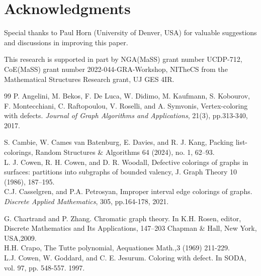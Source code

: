 \documentclass[12pt]{amsart}
\theoremstyle{definition}
\theoremstyle{remark}
\numberwithin{equation}{section}
\begin{document}
\section*{Acknowledgments}
Special thanks to  Paul Horn (University of Denver, USA)  for valuable suggestions and discussions in improving this paper.

This research is supported in part by NGA(MaSS) grant number UCDP-712,
CoE(MaSS) grant number 2022-044-GRA-Workshop,
NITheCS from the Mathematical Structures Research grant,
UJ GES 4IR.


\begin{thebibliography}{99}
 P. Angelini, M. Bekos, F. De Luca, W. Didimo, M. Kaufmann, S. Kobourov, F. Montecchiani, C. Raftopoulou, V. Roselli, and A. Symvonis, Vertex-coloring with defects. \textit{Journal of Graph Algorithms and Applications}, 21(3), pp.313-340, 2017.

 S. Cambie, W. Cames van Batenburg, E. Davies, and R. J. Kang, Packing list-colorings, Random Structures \& Algorithms 64 (2024), no. 1, 62–93. \\ %

 L. J. Cowen, R. H. Cowen, and D. R. Woodall,
Defective colorings of graphs in surfaces: partitions into subgraphs of bounded valency, J. Graph Theory 10 (1986), 187–195. \\ %

 C.J. Casselgren, and P.A. Petrosyan, Improper interval edge colorings of graphs. \textit{Discrete Applied Mathematics}, 305, pp.164-178, 2021.

 G. Chartrand and P. Zhang. Chromatic graph theory. In K.H. Rosen, editor, Discrete Mathematics and Its Applications,  147--203 Chapman \& Hall, New York, USA,2009. \\

H.H. Crapo, The  Tutte polynomial, Aequationes Math.,3 (1969) 211-229.\\

 L.J. Cowen, W. Goddard, and C. E. Jesurum. Coloring with defect. In SODA, vol. 97, pp. 548-557. 1997.


\end{thebibliography}
\end{document}
